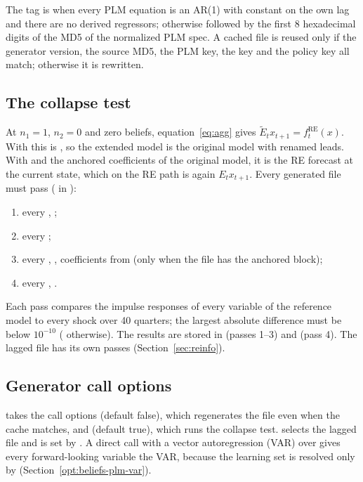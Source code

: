 \documentclass[11pt,a4paper]{article}
\newcommand{\RE}{\mathrm{RE}}
\newcommand{\fRE}{f^{\RE}}
\newcommand{\Eagg}{\tilde{E}}
\begin{document}
The tag is  when every PLM equation is an AR(1) with constant on the own lag and there
are no derived regressors; otherwise  followed by the first 8 hexadecimal digits of the
MD5 of the normalized PLM spec. A cached file is reused only if the generator version, the
source MD5, the PLM key, the  key and the policy key all match; otherwise it is
rewritten.

\subsection{The collapse test}\label{sec:collapse}

At $n_1 = 1$, $n_2 = 0$ and zero beliefs, equation~\eqref{eq:agg} gives $\Eagg_t x_{t+1} =
\fRE_t(x)$. With  this is , so the extended model is the
original model with renamed leads. With  and the anchored coefficients
of the original model, it is the RE forecast at the current state, which on the RE path is again
$E_t x_{t+1}$. Every generated file must pass ( in ):

\begin{enumerate}[nosep]
  \item every , ;
  \item every ;
  \item every , , coefficients from
         (only when the file has the anchored block);
  \item every , .
\end{enumerate}

Each pass compares the impulse responses of every variable of the reference model to every
shock over 40 quarters; the largest absolute difference must be below $10^{-10}$
( otherwise). The results are stored in
 (passes 1--3) and  (pass 4). The
lagged file has its own passes (Section~\ref{sec:reinfo}).

\subsection{Generator call options}\label{opt:extend-model}

 takes the call options 
(default false), which regenerates the file even when the cache matches, and 
(default true), which runs the collapse test.  selects the lagged file and is set
by . A direct call with a vector autoregression (VAR) over
 gives every forward-looking variable the VAR, because the learning set is resolved only by
 (Section~\ref{opt:beliefs-plm-var}).
\end{document}
